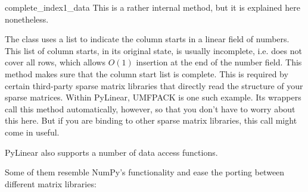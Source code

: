 \begin{methoddesc}[SparseExecuteMatrix]{complete_index1_data}{}
  This is a rather internal method, but it is explained here
  nonetheless.

  The  class uses a list to indicate the
  column starts in a linear field of numbers. This list of column
  starts, in its original state, is usually incomplete, i.e. does not
  cover all rows, which allows $O(1)$ insertion at the end of the
  number field. This method makes sure that the column start list is
  complete. This is required by certain third-party sparse matrix
  libraries that directly read the structure of your sparse
  matrices. Within PyLinear, UMFPACK is one such example. Its wrappers
  call this method automatically, however, so that you don't have to
  worry about this here. But if you are binding to other sparse matrix
  libraries, this call might come in useful.
\end{methoddesc}

PyLinear also supports a number of data access functions.

Some of them resemble NumPy's functionality and ease the porting between
different matrix libraries:

